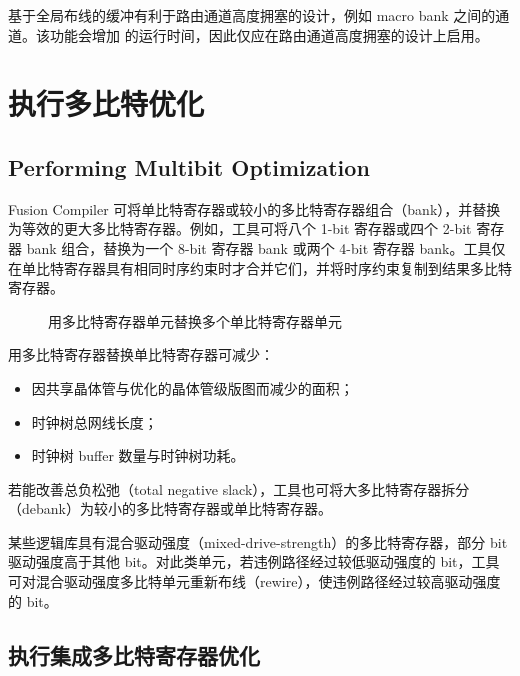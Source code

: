 基于全局布线的缓冲有利于路由通道高度拥塞的设计，例如 macro bank 之间的通道。该功能会增加  的运行时间，因此仅应在路由通道高度拥塞的设计上启用。

\section{执行多比特优化}
\subsection*{Performing Multibit Optimization}

Fusion Compiler 可将单比特寄存器或较小的多比特寄存器组合（bank），并替换为等效的更大多比特寄存器。例如，工具可将八个 1-bit 寄存器或四个 2-bit 寄存器 bank 组合，替换为一个 8-bit 寄存器 bank 或两个 4-bit 寄存器 bank。工具仅在单比特寄存器具有相同时序约束时才合并它们，并将时序约束复制到结果多比特寄存器。

\begin{figure}[htbp]
\centering
{}
\caption{用多比特寄存器单元替换多个单比特寄存器单元}
\label{fig:multibit-replace}
\end{figure}

用多比特寄存器替换单比特寄存器可减少：
\begin{itemize}
  \item 因共享晶体管与优化的晶体管级版图而减少的面积；
  \item 时钟树总网线长度；
  \item 时钟树 buffer 数量与时钟树功耗。
\end{itemize}

若能改善总负松弛（total negative slack），工具也可将大多比特寄存器拆分（debank）为较小的多比特寄存器或单比特寄存器。

某些逻辑库具有混合驱动强度（mixed-drive-strength）的多比特寄存器，部分 bit 驱动强度高于其他 bit。对此类单元，若违例路径经过较低驱动强度的 bit，工具可对混合驱动强度多比特单元重新布线（rewire），使违例路径经过较高驱动强度的 bit。

\subsection{执行集成多比特寄存器优化}
